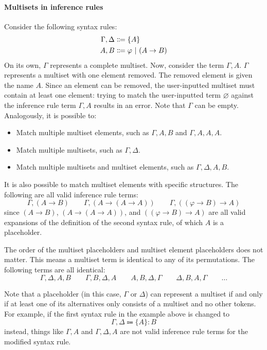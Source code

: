 \paragraph{Multisets in inference rules}
\label{inference:multisets}
Consider the following syntax rules:
\begin{align*}
    \Gamma, \Delta &\Coloneqq \{ A \} \\
    A, B &\Coloneqq \varphi \ |\  (A \to B)
\end{align*}
On its own, $\Gamma$ represents a complete multiset. Now, consider the term $\Gamma, A$. $\Gamma$ represents a multiset with one element removed. The removed element is given the name $A$. Since an element can be removed, the user-inputted multiset must contain at least one element: trying to match the user-inputted term $\varnothing$ against the inference rule term $\Gamma, A$ results in an error. Note that $\Gamma$ can be empty. Analogously, it is possible to:
\begin{itemize}
    \item Match multiple multiset elements, such as $\Gamma, A, B$ and $\Gamma, A, A, A$.
    \item Match multiple multisets, such as $\Gamma, \Delta$.
    \item Match multiple multisets and multiset elements, such as $\Gamma, \Delta, A, B$.
\end{itemize}

It is also possible to match multiset elements with specific structures. The following are all valid inference rule terms:
\[
    \Gamma, (A \to B) \qquad \Gamma, (A \to (A \to A)) \qquad \Gamma, ((\varphi \to B) \to A)
\]
since $(A \to B)$, $(A \to (A \to A))$, and $((\varphi \to B) \to A)$ are all valid expansions of the definition of the second syntax rule, of which $A$ is a placeholder.

The order of the multiset placeholders and multiset element placeholders does not matter. This means a multiset term is identical to any of its permutations. The following terms are all identical:
\[
    \Gamma, \Delta, A, B \qquad \Gamma, B, \Delta, A \qquad A, B, \Delta, \Gamma \qquad \Delta, B, A, \Gamma \qquad \ldots
\]

Note that a placeholder (in this case, $\Gamma$ or $\Delta$) can represent a multiset if and only if at least one of its alternatives only consists of a multiset and no other tokens. For example, if the first syntax rule in the example above is changed to
\[
    \Gamma, \Delta \Coloneqq \{ A \}: B
\]
instead, things like $\Gamma, A$ and $\Gamma, \Delta, A$ are not valid inference rule terms for the modified syntax rule.

